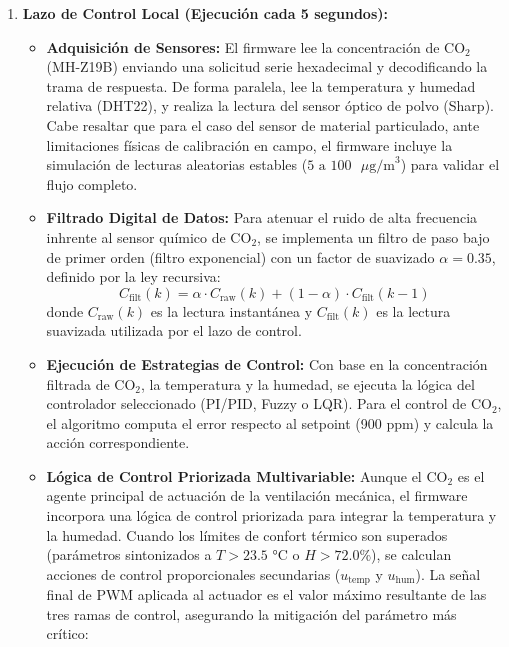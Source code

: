 \begin{enumerate}
    \item \textbf{Lazo de Control Local (Ejecución cada 5 segundos):}
          \begin{itemize}
              \item \textbf{Adquisición de Sensores:} El firmware lee la concentración de CO$_2$ (MH-Z19B) enviando una solicitud serie hexadecimal y decodificando la trama de respuesta. De forma paralela, lee la temperatura y humedad relativa (DHT22), y realiza la lectura del sensor óptico de polvo (Sharp). Cabe resaltar que para el caso del sensor de material particulado, ante limitaciones físicas de calibración en campo, el firmware incluye la simulación de lecturas aleatorias estables ($5\text{ a }100\text{ }\mu\text{g/m}^3$) para validar el flujo completo.
              \item \textbf{Filtrado Digital de Datos:} Para atenuar el ruido de alta frecuencia inhrente al sensor químico de CO$_2$, se implementa un filtro de paso bajo de primer orden (filtro exponencial) con un factor de suavizado $\alpha = 0.35$, definido por la ley recursiva:
                    \begin{equation}
                        C_{\text{filt}}(k) = \alpha \cdot C_{\text{raw}}(k) + (1 - \alpha) \cdot C_{\text{filt}}(k-1)
                    \end{equation}
                    donde $C_{\text{raw}}(k)$ es la lectura instantánea y $C_{\text{filt}}(k)$ es la lectura suavizada utilizada por el lazo de control.
              \item \textbf{Ejecución de Estrategias de Control:} Con base en la concentración filtrada de CO$_2$, la temperatura y la humedad, se ejecuta la lógica del controlador seleccionado (PI/PID, Fuzzy o LQR). Para el control de CO$_2$, el algoritmo computa el error respecto al setpoint (900 ppm) y calcula la acción correspondiente.
              \item \textbf{Lógica de Control Priorizada Multivariable:} Aunque el CO$_2$ es el agente principal de actuación de la ventilación mecánica, el firmware incorpora una lógica de control priorizada para integrar la temperatura y la humedad. Cuando los límites de confort térmico son superados (parámetros sintonizados a $T > 23.5$ °C o $H > 72.0\%$), se calculan acciones de control proporcionales secundarias ($u_{\text{temp}}$ y $u_{\text{hum}}$). La señal final de PWM aplicada al actuador es el valor máximo resultante de las tres ramas de control, asegurando la mitigación del parámetro más crítico:
                    \begin{equation}

\end{equation}
\end{itemize}
\end{enumerate}
